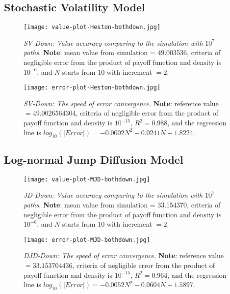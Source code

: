 \subsection{Stochastic Volatility Model}
\begin{figure}[H]
    \centering
    \texttt{[image: value-plot-Heston-bothdown.jpg]}
    \caption[\emph{SV-Down: Value accuracy comparing to the simulation with} $10^7$ \emph{paths.}]{\emph{SV-Down: Value accuracy comparing to the simulation with} $10^7$ \emph{paths.} \textbf{Note}: mean value from simulation = 49.003536, criteria of negligible error from the product of payoff function and density is $10^{-6}$, and $N$ starts from $10$  with increment $=2$.}

    \label{fig:label}
\end{figure}
\begin{figure}[H]
    \centering
    \texttt{[image: error-plot-Heston-bothdown.jpg]}
    \caption[\emph{SV-Down: The speed of error convergence.}]{\emph{SV-Down: The speed of error convergence.} \textbf{Note}: reference value $=49.0026564304$, criteria of negligible error from the product of payoff function and density is $10^{-15}$, $R^2=0.988$, and the regression line is $log_{10}\left(|Error|\right) = -0.0002N^2-0.0241N+1.8224$.}

    \label{fig:label}
\end{figure}


\subsection{Log-normal Jump Diffusion Model}
\begin{figure}[H]
    \centering
    \texttt{[image: value-plot-MJD-bothdown.jpg]}
    \caption[\emph{JD-Down: Value accuracy comparing to the simulation with} $10^7$ \emph{paths.}]{\emph{JD-Down: Value accuracy comparing to the simulation with} $10^7$ \emph{paths.} \textbf{Note}: mean value from simulation = 33.154370, criteria of negligible error from the product of payoff function and density is $10^{-6}$, and $N$ starts from $10$  with increment $=2$.}

    \label{fig:label}
\end{figure}

\begin{figure}[H]
    \centering
    \texttt{[image: error-plot-MJD-bothdown.jpg]}
    \caption[\emph{JD-Down: The speed of error convergence.}]{\emph{DJD-Down: The speed of error convergence.} \textbf{Note}: reference value $=33.153704436$, criteria of negligible error from the product of payoff function and density is $10^{-15}$, $R^2=0.964$, and the regression line is $log_{10}\left(|Error|\right) = -0.0052N^2-0.0604N+1.5897$.}

    \label{fig:label}
\end{figure}


